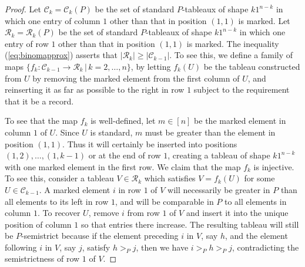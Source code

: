 \documentclass[10pt,a4paper]{amsart}
\begin{document}
\begin{proof}
  Let $\mathcal C_k = \mathcal C_k(P)$
  be the set of standard $P$-tableaux of shape
  $k 1^{n-k}$ in which one entry of column $1$
  other than that in position $(1,1)$ is marked.
  Let $\mathcal R_k = \mathcal R_k(P)$
  be the set of standard $P$-tableaux of shape
  $k 1^{n-k}$ in which one entry of row $1$
  other than that in position $(1,1)$ is marked.
  The inequality (\ref{eq:binomapprox}) asserts that
  $|\mathcal R_k| \geq |\mathcal C_{k-1}|$.
  To see this, we define a family of maps
  $\{f_k: \mathcal C_{k-1} \rightarrow \mathcal R_k \,|\, k = 2,\dotsc, n\}$,
  by letting
  $f_k(U)$ be the tableau constructed from $U$ by
  removing the marked element from the first column of $U$,
  and reinserting it as far as possible to the right in row $1$
  subject to the requirement that it be a record.

  To see that the map $f_k$ is well-defined,
  let $m \in [n]$ be the marked element in column $1$ of $U$.
  Since $U$ is standard,
  $m$ must be greater than the element in position $(1,1)$.
  Thus it will certainly be inserted into positions $(1,2), \dotsc, (1,k-1)$
  or at the end of row $1$, creating a tableau of shape $k1^{n-k}$ with
  one marked element in the first row.
  We claim that the map $f_k$ is injective.
  To see this,
  consider a tableau $V \in \mathcal R_{k}$
  which satisfies $V = f_k(U)$ for some $U \in \mathcal C_{k-1}$.
  A marked element $i$ in row $1$ of $V$ will necessarily be greater in $P$
  than all elements to its left in row $1$, and will be comparable in $P$
  to all elements in column $1$.
  To recover $U$, remove $i$ from row $1$ of $V$
  and insert it into the unique position of column $1$ so that entries there
  increase.  The resulting tableau will still be $P$-semistrict
  because if the element preceding $i$ in $V$, say $h$,
  and the element following $i$ in $V$, say $j$,
  satisfy $h >_P j$, then we have $i >_P h >_P j$, contradicting
  the semistrictness of row $1$ of $V$.
  

\end{proof}
\end{document}
